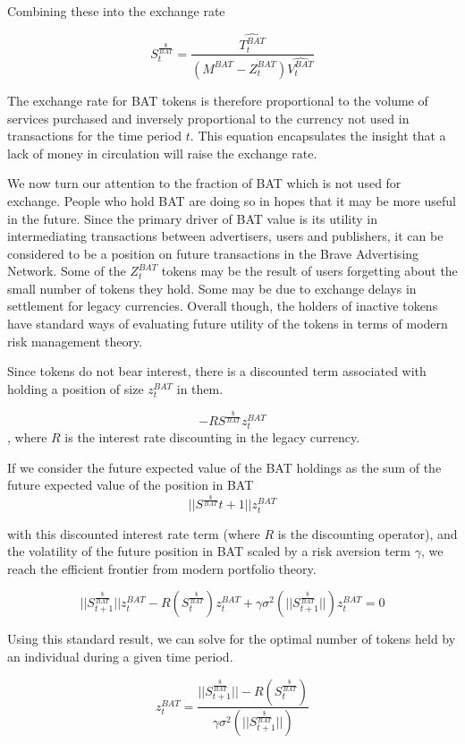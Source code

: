 \documentclass[11pt]{article}
\begin{document}
Combining these into the exchange rate

\[ \tag{1} S^{\frac{\$}{BAT}}_{t} = \frac{\widehat{T^{BAT}_{t}}}{(M^{BAT} - Z^{BAT}_{t} ) \widehat{V^{BAT}_{t}}} \]

The exchange rate for BAT tokens is therefore proportional to the
volume of services purchased and inversely proportional to the
currency not used in transactions for the time period $t$. This equation
encapsulates the insight that a lack of money in circulation will
raise the exchange rate.

We now turn our attention to the fraction of BAT which is not used for
exchange. People who hold BAT are doing so in hopes that it may be
more useful in the future. Since the primary driver of BAT value is
its utility in intermediating transactions between advertisers, users
and publishers, it can be considered to be a position on future
transactions in the Brave Advertising Network. Some of the $Z^{BAT}_{t}$ tokens may
be the result of users forgetting about the small number of tokens
they hold. Some may be due to exchange delays in settlement for legacy
currencies. Overall though, the holders of inactive tokens have
standard ways of evaluating future utility of the tokens in terms of
modern risk management theory.

Since tokens do not bear interest, there is a discounted term
associated with holding a position of size  $z^{BAT}_{t}$ in them.

\[ -R S^{\frac{\$}{BAT}} z^{BAT}_{t} \], where $R$ is the
interest rate discounting in the legacy currency.

If we consider the future expected value of the BAT holdings as the
sum of the future expected value of the position in  BAT
\[ ||S^{\frac{\$}{BAT}}{t+1}|| z^{BAT}_{t}\]

with this discounted interest rate term (where $R$ is the discounting operator),
and the volatility of the future position in BAT scaled by a risk
aversion term $\gamma$, we reach the efficient frontier from modern portfolio
theory.

\[ ||S^{\frac{\$}{BAT}}_{t+1}|| z^{BAT}_{t} -R (S^{\frac{\$}{BAT}}_{t}) z^{BAT}_{t} + \gamma \sigma^{2}(||S^{\frac{\$}{BAT}}_{t+1}||) z^{BAT}_{t} =0\]

Using this standard result, we can solve for the optimal number of
tokens held by an individual during a given time period.

\[ z^{BAT}_{t} =\frac{||S^{\frac{\$}{BAT}}_{t+1}|| -R( S^{\frac{\$}{BAT}}_{t})}{ \gamma \sigma^{2}(||S^{\frac{\$}{BAT}}_{t+1}||) } \]
\end{document}
